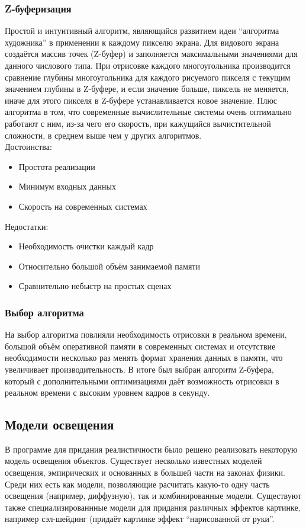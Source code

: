 \documentclass[a4paper,12pt]{report}
\numberwithin{equation}{section}
\begin{document}
\subsubsection*{Z-буферизация}
Простой и интуитивный алгоритм, являющийся развитием идеи ``алгоритма художника'' в применении к каждому пикселю экрана. Для видового экрана создаётся массив точек (Z-буфер) и заполняется максимальными значениями для данного числового типа. При отрисовке каждого многоугольника производится сравнение глубины многоугольника для каждого рисуемого пикселя с текущим значением глубины в Z-буфере, и если значение больше, пиксель не меняется, иначе для этого пикселя в Z-буфере устанавливается новое значение. Плюс алгоритма в том, что современные вычислительные системы очень оптимально работают с ним, из-за чего его скорость, при кажущийся вычистительной сложности, в среднем выше чем у других алгоритмов. \\
Достоинства:
\begin{itemize}
\item Простота реализации
\item Минимум входных данных
\item Скорость на современных системах
\end{itemize}
Недостатки:
\begin{itemize}
\item Необходимость очистки каждый кадр
\item Относительно большой объём занимаемой памяти
\item Сравнительно небыстр на простых сценах
\end{itemize}

\subsubsection*{Выбор алгоритма}
На выбор алгоритма повлияли необходимость отрисовки в реальном времени, большой объём оперативной памяти в современных системах и отсутствие необходимости несколько раз менять формат хранения данных в памяти, что увеличивает производительность. В итоге был выбран алгоритм Z-буфера, который с дополнительными оптимизациями даёт возможность отрисовки в реальном времени с высоким уровнем кадров в секунду.

\subsection{Модели освещения} \label{lighting_reasoning_section}
В программе для придания реалистичности было решено реализовать некоторую модель освещения объектов. Существует несколько известных моделей освещения, эмпирических и основанных в большей части на законах физики. Среди них есть как модели, позволяющие расчитать какую-то одну часть освещения (например, диффузную), так и комбинированные модели. Существуют также специализированнные модели для придания различных эффектов картинке, например сэл-шейдинг (придаёт картинке эффект ``нарисованной от руки''.
\end{document}
